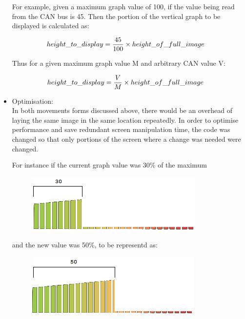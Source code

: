 \documentclass[11pt]{report} %
\begin{document}
\begin{itemize}
	
	For example, given a maximum graph value of 100, if the value being read 
	from the CAN bus is 45. Then the portion of the vertical graph to be displayed is calculated as:
					
	\begin{center}			
	\begin{equation}
	\aligned
	height\_to\_display &= \frac{45}{100} \times height\_of\_full\_image
	\endaligned
	\end{equation}				
	
	Thus for a given maximum graph value M and arbitrary CAN value V:
	
	\begin{equation}
	\aligned
	height\_to\_display &= \frac{V}{M} \times height\_of\_full\_image
	\endaligned
	\end{equation}				
	\end{center}					
					
	\item Optimisation:\\
	In both movements forms discussed above, there would be an overhead of laying the same image
	in the same location repeatedly. In order to optimise performance and save redundant screen manipulation time,
	the code was changed so that only portions of the screen where a change was needed were changed.
				
	For instance if the current graph value was 30\% of the maximum
	
		\begin{figure}[H]
	\centering
	\includegraphics[scale=0.80]{images/rpm_30.png}
	\caption{}\label{fig: rpm 30}
	\end{figure}

				
	and the new value was 50\%, to be representd as: 
	
	\begin{figure}[H]
	\centering
	\includegraphics[scale=0.80]{images/rpm_50.png}
	\caption{ }\label{fig:rpm 50}
	\end{figure}
	

\end{itemize}
\end{document}
